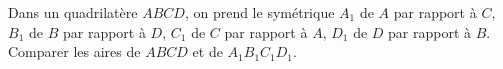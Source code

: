 Dans un quadrilatère $ABCD$, on prend le symétrique $A_1$ de $A$ par rapport à $C$, $B_1$ de $B$ par rapport à $D$, $C_1$ de $C$ par rapport à $A$, $D_1$ de $D$ par rapport à $B$. Comparer les aires de $ABCD$ et de $A_1B_1C_1D_1$.

